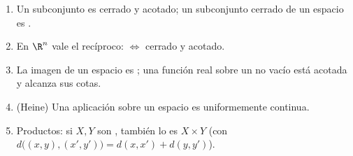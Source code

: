 \begin{theorem}\label{thm:b2:metric:compactprops}
\begin{enumerate}
  \item Un subconjunto  es cerrado y acotado; un subconjunto
        cerrado de un espacio  es .
  \item En $\R^n$ vale el recíproco:  $\iff$ cerrado y
        acotado.
  \item La imagen  de un espacio  es ; una
        función real  sobre un  no vacío está acotada
        y alcanza sus cotas.
  \item (Heine) Una aplicación  sobre un espacio  es
        uniformemente continua.
  \item Productos: si $X, Y$ son , también lo es $X \times Y$
        (con $d\bigl((x,y),(x',y')\bigr) = d(x,x') + d(y,y')$).
\end{enumerate}
\end{theorem}

